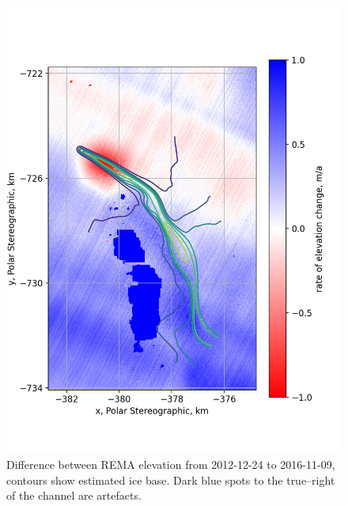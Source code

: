 \begin{figure}[h!]
\includegraphics[width=1\textwidth]{chapters/2/REMAdiff_alone.png}
\caption[REMA difference map]{Difference between REMA elevation from 2012-12-24 to 2016-11-09, contours show estimated ice base. Dark blue spots to the true--right of the channel are artefacts.}
\label{fig:REMAdiff_alone.png}
\end{figure}



